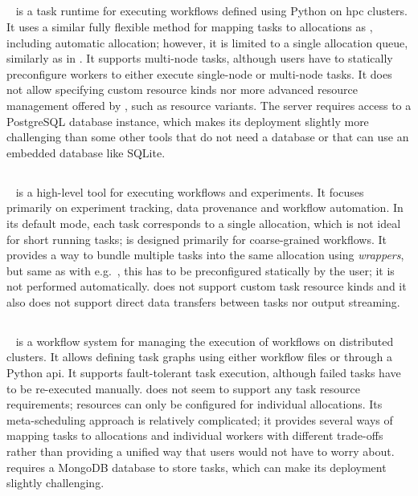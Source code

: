 \begin{spacing}{1}
\subsection*{\balsam}
\balsam~\cite{balsam} is a task runtime for executing workflows defined using Python on
\gls{hpc} clusters. It uses a similar fully flexible method for mapping tasks to
allocations as \hyperqueue{}, including automatic allocation; however, it is limited to a
single allocation queue, similarly as in \dask{}. It supports multi-node tasks,
although users have to statically preconfigure workers to either execute single-node or multi-node
tasks. It does not allow specifying custom resource kinds nor more advanced resource
management offered by \hyperqueue{}, such as resource variants. The \balsam{} server requires access to a PostgreSQL database instance, which makes
its deployment slightly more challenging than some other tools that do not need a database or that
can use an embedded database like SQLite.

\subsection*{\autosubmit}
\autosubmit~\cite{autosubmit} is a high-level tool for executing workflows and experiments. It
focuses primarily on experiment tracking, data provenance and workflow automation. In its default mode,
each task corresponds to a single allocation, which is not ideal for short running tasks;
\autosubmit{} is designed primarily for coarse-grained workflows. It provides a way to
bundle multiple tasks into the same allocation using \emph{wrappers}, but same as with
e.g.\ \pegasus{}, this has to be preconfigured statically by the user; it is not
performed automatically. \autosubmit{} does not support custom task resource kinds
and it also does not support direct data transfers between tasks nor output streaming.

\subsection*{\fireworks}
\fireworks~\cite{fireworks} is a workflow system for managing the execution of workflows on
distributed clusters. It allows defining task graphs using either workflow files or through a
Python \gls{api}. It supports fault-tolerant task execution, although failed tasks
have to be re-executed manually. \fireworks{} does not seem to support any task resource
requirements; resources can only be configured for individual allocations. Its meta-scheduling
approach is relatively complicated; it provides several ways of mapping tasks to allocations and
individual workers with different trade-offs rather than providing a unified way that users would
not have to worry about. \fireworks{} requires a MongoDB database to store tasks, which can make its deployment slightly challenging.


\end{spacing}
